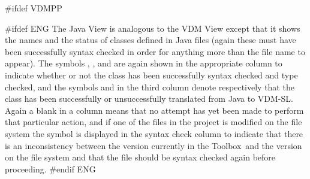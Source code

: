 \documentclass[\pformat,12pt]{article}
\newcommand{\vdmslpp}{VDM-SL}
\newcommand{\Toolbox}{Toolbox}
\newcommand{\vdmslpp}{VDM++}
\newcommand{\Toolbox}{Toolbox}
\newcommand{\guicmd}[1]{{\sf #1}}
\newcommand{\guicmd}[1]{{\gt #1}}
\begin{document}
#ifdef VDMPP

#ifdef ENG
The \guicmd{Java View} is analogous to the \guicmd{VDM View} except
that it shows the names and the status of classes defined in Java
files (again these must have been successfully syntax checked in order
for anything more than the file name to appear). The
symbols 
,
,
 and
are again shown in the appropriate column to indicate whether or not
the class has been successfully syntax checked and type checked, and
the symbols 
and
in the third column denote respectively that the class has been
successfully or unsuccessfully translated from Java to \vdmslpp.
Again a blank in a column means that no attempt has yet been made to
perform that particular action, and if one of the files in the project
is modified on the file system the symbol
is displayed in the \guicmd{syntax check} column  to indicate
that there is an inconsistency between the version currently in the \Toolbox\ and the
version on the file system and that the file should be syntax checked
again before proceeding.
#endif ENG
\end{document}
